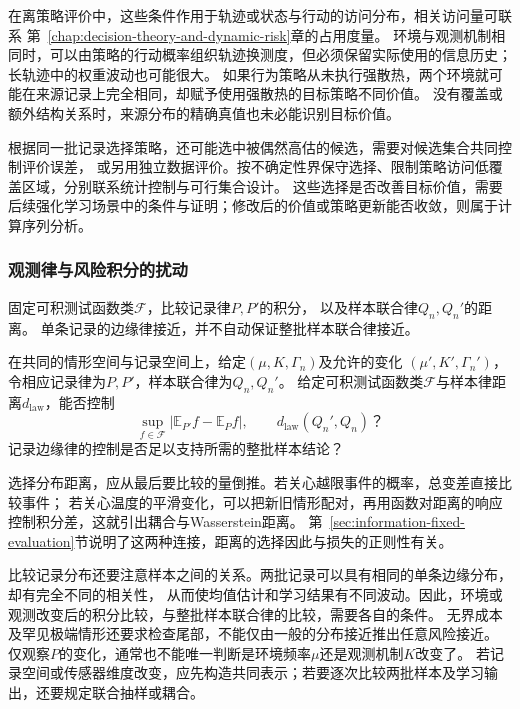 在离策略评价中，这些条件作用于轨迹或状态与行动的访问分布，相关访问量可联系
第~\ref{chap:decision-theory-and-dynamic-risk}章的占用度量。
环境与观测机制相同时，可以由策略的行动概率组织轨迹换测度，但必须保留实际使用的信息历史；
长轨迹中的权重波动也可能很大。
如果行为策略从未执行强散热，两个环境就可能在来源记录上完全相同，却赋予使用强散热的目标策略不同价值。
没有覆盖或额外结构关系时，来源分布的精确真值也未必能识别目标价值。

根据同一批记录选择策略，还可能选中被偶然高估的候选，需要对候选集合共同控制评价误差，
或另用独立数据评价。按不确定性界保守选择、限制策略访问低覆盖区域，分别联系统计控制与可行集合设计。
这些选择是否改善目标价值，需要后续强化学习场景中的条件与证明；修改后的价值或策略更新能否收敛，则属于计算序列分析。

\subsubsection{观测律与风险积分的扰动}
\label{sec:future-analysis-data-law-perturbation}

固定可积测试函数类$\mathcal F$，比较记录律$P,P'$的积分，
以及样本联合律$Q_n,Q_n'$的距离。
单条记录的边缘律接近，并不自动保证整批样本联合律接近。

\begin{mathproblem}[观测规律与风险积分的扰动]
  \label{question:future-data-law-perturbation}
  在共同的情形空间与记录空间上，给定$(\mu,K,\Gamma_n)$及允许的变化
  $(\mu',K',\Gamma_n')$，令相应记录律为$P,P'$，样本联合律为$Q_n,Q_n'$。
  给定可积测试函数类$\mathcal F$与样本律距离$d_{\mathrm{law}}$，能否控制
  \[
    \sup_{f\in\mathcal F}|\mathbb E_{P'}f-\mathbb E_Pf|,
    \qquad d_{\mathrm{law}}(Q_n',Q_n)\text{？}
  \]
  记录边缘律的控制是否足以支持所需的整批样本结论？
\end{mathproblem}

选择分布距离，应从最后要比较的量倒推。若关心越限事件的概率，总变差直接比较事件；
若关心温度的平滑变化，可以把新旧情形配对，再用函数对距离的响应控制积分差，这就引出耦合与Wasserstein距离。
第~\ref{sec:information-fixed-evaluation}节说明了这两种连接，距离的选择因此与损失的正则性有关。

比较记录分布还要注意样本之间的关系。两批记录可以具有相同的单条边缘分布，却有完全不同的相关性，
从而使均值估计和学习结果有不同波动。因此，环境或观测改变后的积分比较，与整批样本联合律的比较，需要各自的条件。
无界成本及罕见极端情形还要求检查尾部，不能仅由一般的分布接近推出任意风险接近。
仅观察$P$的变化，通常也不能唯一判断是环境频率$\mu$还是观测机制$K$改变了。
若记录空间或传感器维度改变，应先构造共同表示；若要逐次比较两批样本及学习输出，还要规定联合抽样或耦合。

